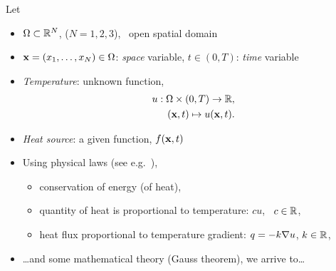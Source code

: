 \SetEmptyBackground
\begin{frame}
  Let
  \begin{itemize}
  \item $\Omega\subset{\mathbb R}^N$, \quad ($N=1,2,3$), \ open spatial domain 
  \item $\mathbf{x}=(x_1,\dots,x_N) \in \Omega$: \textit{space} variable,
    \quad $t\in (0,T)$: \textit{time} variable
  \item \textit{Temperature}: unknown function,
    \begin{align*}
    u:\Omega\times (0,T) \to {\mathbb R}, \\
      (\mathbf{x},t) \mapsto u(\mathbf{x},t).
    \end{align*}
    \vspace{-1em}
  \item \textit{Heat source}: a given function, $f(\mathbf{x},t)$
    \vspace{0.66em}
  \item Using physical laws (see e.g.~\cite{allaire:2007}),
    \begin{itemize}
    \item conservation of energy (of heat),
    \item quantity of heat is proportional to temperature: $c u$, \ $c\in{\mathbb R}$,
    \item heat flux proportional to temperature gradient: $q=-k\nabla u$, $k\in{\mathbb R}$,
    \end{itemize}
  \item \dots and some mathematical theory (Gauss theorem), we arrive to\dots
  \end{itemize}
\end{frame}

